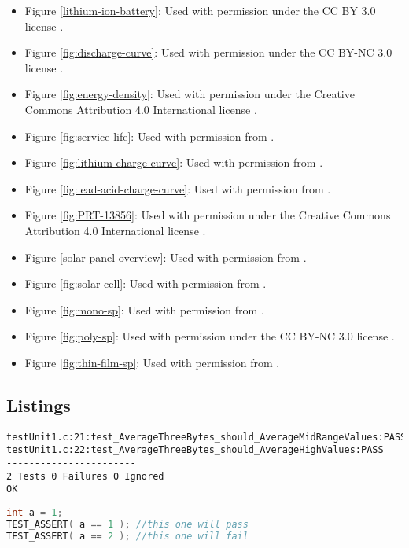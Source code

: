 \begin{itemize}
\item Figure \ref{lithium-ion-battery}: Used with permission under the CC BY 3.0 license \cite{lithium-batt-ref}.
\item Figure \ref{fig:discharge-curve}: Used with permission under the CC BY-NC 3.0 license \cite{lithium-dis-ref}.
\item Figure \ref{fig:energy-density}: Used with permission under the Creative Commons Attribution 4.0 International license \cite{Energy-den-ref}.
\item Figure \ref{fig:service-life}: Used with permission from \cite{serv-life-ref}.
\item Figure \ref{fig:lithium-charge-curve}: Used with permission from \cite{lith-charge-ref}.
\item Figure \ref{fig:lead-acid-charge-curve}: Used with permission from \cite{lead-charge-ref}.
\item Figure \ref{fig:PRT-13856}: Used with permission under the Creative Commons Attribution 4.0 International license \cite{PRT-ref}.
\item Figure \ref{solar-panel-overview}: Used with permission from \cite{solar-panels-ref}.
\item Figure \ref{fig:solar cell}: Used with permission from \cite{solar-cell-ref}.
\item Figure \ref{fig:mono-sp}: Used with permission from \cite{solar-mono-ref}.
\item Figure \ref{fig:poly-sp}: Used with permission under the CC BY-NC 3.0 license \cite{solar-poly-ref}.
\item Figure \ref{fig:thin-film-sp}: Used with permission from \cite{solar-thin-ref}.

\end{itemize}

\newpage
\subsection{Listings}
\renewcommand{\lstlistlistingname}{}
\lstlistoflistings
\hfill

\begin{lstlisting}[label={lst:unity-report}, caption=Example Unity Test Report Output \cite{unity-homepage}]
testUnit1.c:21:test_AverageThreeBytes_should_AverageMidRangeValues:PASS
testUnit1.c:22:test_AverageThreeBytes_should_AverageHighValues:PASS
-----------------------
2 Tests 0 Failures 0 Ignored
OK
\end{lstlisting}

\begin{lstlisting}[language=C, label={lst:unity-test-assert}, caption=Unity Basic Assertion Example
\cite{unity-homepage}]
int a = 1;
TEST_ASSERT( a == 1 ); //this one will pass
TEST_ASSERT( a == 2 ); //this one will fail
\end{lstlisting}

